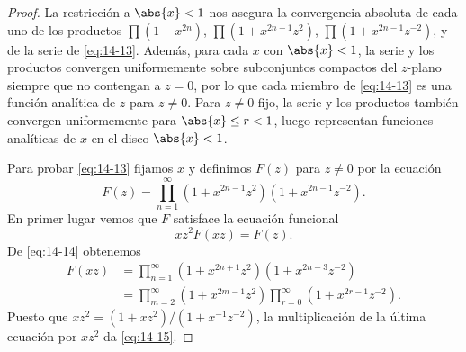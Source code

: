 \documentclass[12pt,a4paper]{book}
\begin{document}
    \begin{proof}
        La restricción a $\abs{x}<1$ nos asegura la convergencia absoluta de cada uno de los
        productos $\prod(1-x^{2n})$, $\prod(1+x^{2n-1}z^{2})$, $\prod(1+x^{2n-1}z^{-2})$, y de la
        serie de \eqref{eq:14-13}. Además, para cada $x$ con $\abs{x}<1$, la serie y los productos
        convergen uniformemente sobre subconjuntos compactos del $z$-plano siempre que no
        contengan a $z=0$, por lo que cada miembro de \eqref{eq:14-13} es una función analítica de
        $z$ para $z\neq0$. Para $z\neq0$ fijo, la serie y los productos también convergen
        uniformemente para $\abs{x}\leq r<1$, luego representan funciones analíticas de $x$ en el
        disco $\abs{x}<1$.

        Para probar \eqref{eq:14-13} fijamos $x$ y definimos $F(z)$ para $z\neq0$ por la ecuación
        \begin{equation}\label{eq:14-14}
            F(z)=\prod_{n=1}^{\infty}(1+x^{2n-1}z^{2})(1+x^{2n-1}z^{-2}).
        \end{equation}
        En primer lugar vemos que $F$ satisface la ecuación funcional
        \begin{equation}\label{eq:14-15}
            xz^{2}F(xz)=F(z).
        \end{equation}
        De \eqref{eq:14-14} obtenemos
        \begin{align*}
            F(xz)&=\prod_{n=1}^{\infty}(1+x^{2n+1}z^{2})(1+x^{2n-3}z^{-2})\\
            &=\prod_{m=2}^{\infty}(1+x^{2m-1}z^{2})\prod_{r=0}^{\infty}(1+x^{2r-1}z^{-2}).
        \end{align*}
        Puesto que $xz^{2}=(1+xz^{2})/(1+x^{-1}z^{-2})$, la multiplicación de la última ecuación por
        $xz^{2}$ da \eqref{eq:14-15}.


\end{proof}
\end{document}
